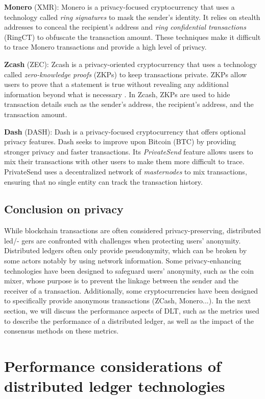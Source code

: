 \textbf{Monero} (XMR): Monero \cite{Saberhagen2013} is a privacy-focused cryptocurrency that uses a technology called \emph{ring signatures} to mask the sender's identity. It relies on stealth addresses to conceal the recipient's address and \emph{ring confidential transactions} (RingCT) to obfuscate the transaction amount. These techniques make it difficult to trace Monero transactions and provide a high level of privacy.

\textbf{Zcash} (ZEC): Zcash \cite{Bowe2016} is a privacy-oriented cryptocurrency that uses a technology called \emph{zero-knowledge proofs} (ZKPs) to keep transactions private. ZKPs allow users to prove that a statement is true without revealing any additional information beyond what is necessary \cite{Goldwasser1985}. In Zcash, ZKPs are used to hide transaction details such as the sender's address, the recipient's address, and the transaction amount.

\textbf{Dash} (DASH): Dash \cite{Duffield2014}is a privacy-focused cryptocurrency that offers optional privacy features. Dash seeks to improve upon Bitcoin (BTC) by providing stronger privacy and faster transactions. Its \emph{PrivateSend} feature allows users to mix their transactions with other users to make them more difficult to trace. PrivateSend uses a decentralized network of \emph{masternodes} to mix transactions, ensuring that no single entity can track the transaction history.

\subsection{Conclusion on privacy}
\label{ss_conclusion_on_privacy}

While blockchain transactions are often considered privacy-preserving, distributed led/- gers are confronted with challenges when protecting users' anonymity. Distributed ledgers often only provide pseudonymity, which can be broken by some actors notably by using network information. Some privacy-enhancing technologies have been designed to safeguard users' anonymity, such as the coin mixer, whose purpose is to prevent the linkage between the sender and the receiver of a transaction. Additionally, some cryptocurrencies have been designed to specifically provide anonymous transactions (ZCash, Monero...). In the next section, we will discuss the performance aspects of DLT, such as the metrics used to describe the performance of a distributed ledger, as well as the impact of the consensus methods on these metrics. 
\section{Performance considerations of distributed ledger technologies}
\label{S_DLT_performance}

